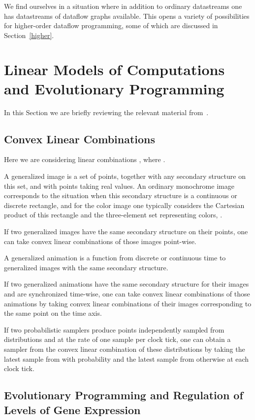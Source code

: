 \documentclass{llncs}
\begin{document}
We find ourselves in a situation where in addition to ordinary datastreams one has datastreams of dataflow graphs available.
This opens a variety of possibilities for higher-order dataflow programming, some of which are discussed in Section~\ref{higher}.


\section{Linear Models of Computations and Evolutionary Programming}\label{linear}

In this Section we are briefly reviewing the relevant material from~\cite{MBukatinMatthews}.

\subsection{Convex Linear Combinations}

Here we are considering linear combinations , where .

A generalized image is a set of points, together with any secondary structure on this set, and with points taking
real values. An ordinary monochrome image corresponds to the situation when this secondary structure is
a continuous or discrete rectangle, and for the color image one typically considers the Cartesian product of this
rectangle and the three-element set representing colors, .

If two generalized images have the same secondary structure on their points, one can take convex linear
combinations of those images point-wise.

A generalized animation is a function from discrete or continuous time to generalized images with the same secondary structure.

If two generalized animations have the same secondary structure for their images and are synchronized time-wise,
one can take convex linear combinations of those animations by taking convex linear combinations of
their images corresponding to the same point on the time axis.

If two probabilistic samplers produce points independently sampled from distributions  and  at the rate
of one sample per clock tick, one can obtain a sampler from the convex linear combination of these distributions
by taking the latest sample from  with probability  and the latest sample from  otherwise at each clock tick.


\subsection{Evolutionary Programming and Regulation of Levels of Gene Expression}
\end{document}
